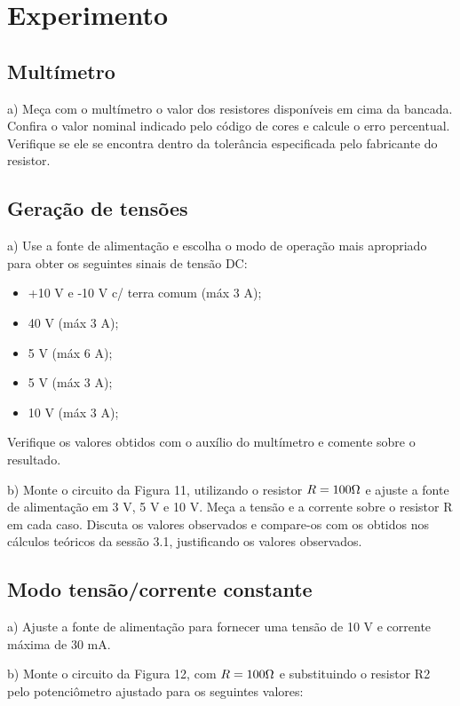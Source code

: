 \newpage
\section{Experimento}

\subsection{Multímetro}

\noindent a) Meça com o multímetro o valor dos resistores disponíveis em cima da bancada. Confira o valor nominal indicado pelo código
de cores e calcule o erro percentual. Verifique se ele se encontra dentro da tolerância especificada pelo fabricante do resistor.

\subsection{Geração de tensões}

\noindent a) Use a fonte de alimentação e escolha o modo de operação mais apropriado para obter os seguintes sinais de tensão DC:

\begin{itemize}
    \item +10 V e -10 V c/ terra comum (máx 3 A);
    \item 40 V (máx 3 A);
    \item 5 V (máx 6 A);
    \item 5 V (máx 3 A);
    \item 10 V (máx 3 A);
\end{itemize}

Verifique os valores obtidos com o auxílio do multímetro e comente sobre o resultado.

\noindent b) Monte o circuito da Figura 11, utilizando o resistor $R = 100 \ohm$ e ajuste a fonte de alimentação em 3 V, 5 V e 10 V. Meça a tensão e a corrente sobre o resistor R em cada caso. Discuta os valores observados e compare-os com os obtidos nos cálculos teóricos da sessão 3.1, justificando os valores observados.

\subsection{Modo tensão/corrente constante}

\noindent a) Ajuste a fonte de alimentação para fornecer uma tensão de 10 V e corrente máxima de 30 mA.

b) Monte o circuito da Figura 12, com $R = 100 \ohm$ e substituindo o resistor R2 pelo potenciômetro ajustado para os seguintes valores:

